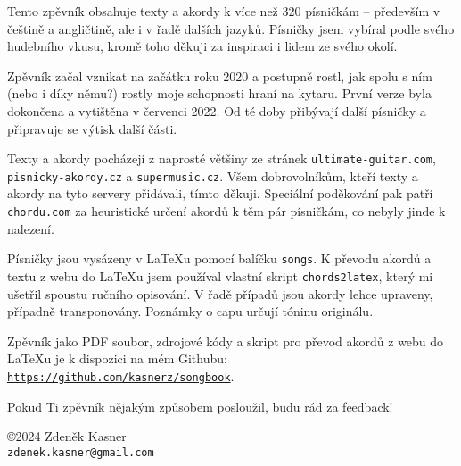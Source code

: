 \documentclass{article}
\begin{document}
\begin{center}
  \vfill

  Tento zpěvník obsahuje texty a akordy k více než 320 písničkám -- především v češtině a angličtině, ale i v řadě dalších jazyků. Písničky jsem vybíral podle svého hudebního vkusu, kromě toho děkuji za inspiraci i lidem ze svého okolí.  \\ \vspace*{0.5cm}

  Zpěvník začal vznikat na začátku roku 2020 a postupně rostl, jak spolu s ním (nebo i díky němu?) rostly moje schopnosti hraní na kytaru. První verze byla dokončena a vytištěna v červenci 2022. Od té doby přibývají další písničky a připravuje se výtisk další části. \\ \vspace*{0.5cm}

  Texty a akordy pocházejí z naprosté většiny ze stránek \texttt{ultimate-guitar.com}, \texttt{pisnicky-akordy.cz} a \texttt{supermusic.cz}. Všem dobrovolníkům, kteří texty a akordy na tyto servery přidávali, tímto děkuji. Speciální poděkování pak patří \texttt{chordu.com} za heuristické určení akordů k těm pár písničkám, co nebyly jinde k nalezení.  \\ \vspace*{0.5cm}

  Písničky jsou vysázeny v \LaTeX u pomocí balíčku \texttt{songs}. K převodu akordů a textu z webu do \LaTeX u jsem používal vlastní skript \texttt{chords2latex}, který mi ušetřil spoustu ručního opisování. V řadě případů jsou akordy lehce upraveny, případně transponovány. Poznámky o capu určují tóninu originálu. \\ \vspace*{0.5cm}

  Zpěvník jako PDF soubor, zdrojové kódy a skript pro převod akordů z webu do \LaTeX u je k dispozici na mém Githubu: \texttt{\url{https://github.com/kasnerz/songbook}}.  \\ \vspace*{0.5cm}

  Pokud Ti zpěvník nějakým způsobem posloužil, budu rád za feedback! \\ \vspace*{0.5cm}


  \copyright 2024 Zdeněk Kasner \\ \vspace*{0.1cm}
  \texttt{zdenek.kasner@gmail.com} \\ \vspace*{0.5cm}
  \byncsa
\end{center}

\end{document}
